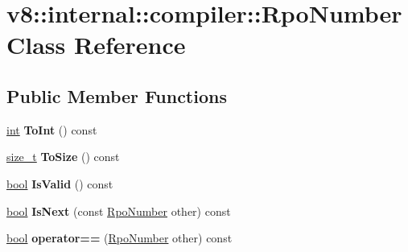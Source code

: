 \hypertarget{classv8_1_1internal_1_1compiler_1_1RpoNumber}{}\section{v8\+:\+:internal\+:\+:compiler\+:\+:Rpo\+Number Class Reference}
\label{classv8_1_1internal_1_1compiler_1_1RpoNumber}
\subsection*{Public Member Functions}
\begin{DoxyCompactItemize}
\item 
\mbox{\label{classv8_1_1internal_1_1compiler_1_1RpoNumber_a6a8b2057a765857c6f6f966f391677f2}} 
\mbox{\hyperlink{classint}{int}} {\bfseries To\+Int} () const
\item 
\mbox{\label{classv8_1_1internal_1_1compiler_1_1RpoNumber_a9c08b8b936c9dc374a7d1177d8c1551d}} 
\mbox{\hyperlink{classsize__t}{size\+\_\+t}} {\bfseries To\+Size} () const
\item 
\mbox{\label{classv8_1_1internal_1_1compiler_1_1RpoNumber_abdd1a3691d792d96e338d2fdb9963d11}} 
\mbox{\hyperlink{classbool}{bool}} {\bfseries Is\+Valid} () const
\item 
\mbox{\label{classv8_1_1internal_1_1compiler_1_1RpoNumber_a995432082bb5fe045392611f7dcbdfea}} 
\mbox{\hyperlink{classbool}{bool}} {\bfseries Is\+Next} (const \mbox{\hyperlink{classv8_1_1internal_1_1compiler_1_1RpoNumber}{Rpo\+Number}} other) const
\item 
\mbox{\label{classv8_1_1internal_1_1compiler_1_1RpoNumber_af2819650ea438e6eed92e4f877fad4ab}} 
\mbox{\hyperlink{classbool}{bool}} {\bfseries operator==} (\mbox{\hyperlink{classv8_1_1internal_1_1compiler_1_1RpoNumber}{Rpo\+Number}} other) const
\item 
\mbox{\label{classv8_1_1internal_1_1compiler_1_1RpoNumber_ae12e458d24c900dd03dd811c8073b2fe}} 

\end{DoxyCompactItemize}
